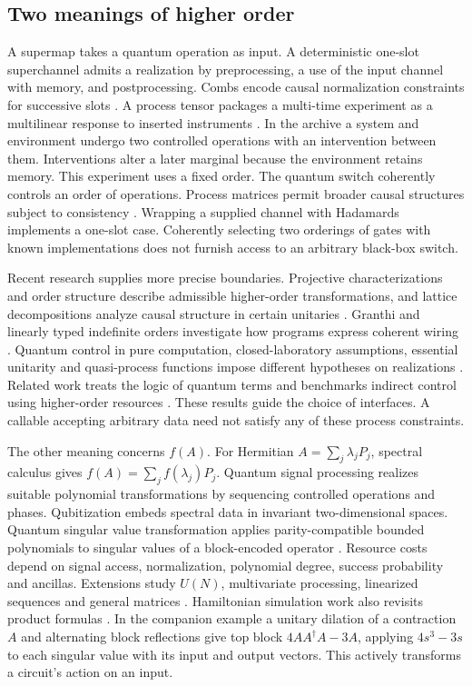 \subsection{Two meanings of higher order}
A supermap takes a quantum operation as input. A deterministic one-slot superchannel admits a realization by preprocessing, a use of the input channel with memory, and postprocessing. Combs encode causal normalization constraints for successive slots \cite{super,combs}. A process tensor packages a multi-time experiment as a multilinear response to inserted instruments \cite{process}. In the archive a system and environment undergo two controlled operations with an intervention between them. Interventions alter a later marginal because the environment retains memory. This experiment uses a fixed order. The quantum switch coherently controls an order of operations. Process matrices permit broader causal structures subject to consistency \cite{switch,indef}. Wrapping a supplied channel with Hadamards implements a one-slot case. Coherently selecting two orderings of gates with known implementations does not furnish access to an arbitrary black-box switch.

Recent research supplies more precise boundaries. Projective characterizations and order structure describe admissible higher-order transformations, and lattice decompositions analyze causal structure in certain unitaries \cite{projectors,jencova,jpos,causaldecomp,guide}. Granthi and linearly typed indefinite orders investigate how programs express coherent wiring \cite{granthi,causaltype}. Quantum control in pure computation, closed-laboratory assumptions, essential unitarity and quasi-process functions impose different hypotheses on realizations \cite{purecontrol,closedlabs,essential,quasip}. Related work treats the logic of quantum terms and benchmarks indirect control using higher-order resources \cite{loglambda,indirect}. These results guide the choice of interfaces. A callable accepting arbitrary data need not satisfy any of these process constraints.

The other meaning concerns $f(A)$. For Hermitian $A=\sum_j\lambda_j P_j$, spectral calculus gives $f(A)=\sum_j f(\lambda_j)P_j$. Quantum signal processing realizes suitable polynomial transformations by sequencing controlled operations and phases. Qubitization embeds spectral data in invariant two-dimensional spaces. Quantum singular value transformation applies parity-compatible bounded polynomials to singular values of a block-encoded operator \cite{qsp,qubitization,qsvt,grand}. Resource costs depend on signal access, normalization, polynomial degree, success probability and ancillas. Extensions study $U(N)$, multivariate processing, linearized sequences and general matrices \cite{qn,mqsp,linearqsp,arbmatrix,recentqsp}. Hamiltonian simulation work also revisits product formulas \cite{trotter26}. In the companion example a unitary dilation of a contraction $A$ and alternating block reflections give top block $4AA^\dagger A-3A$, applying $4s^3-3s$ to each singular value with its input and output vectors. This actively transforms a circuit's action on an input.
